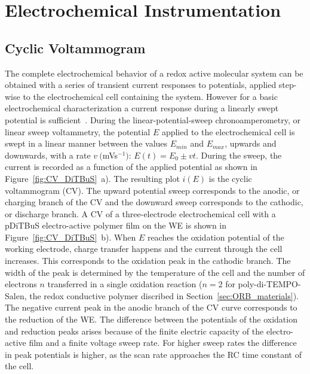 \section{Electrochemical Instrumentation}
\subsection{Cyclic Voltammogram}
The complete electrochemical behavior of a redox active molecular system can be obtained with a series of transient current responses to potentials, applied step-wise to the electrochemical cell containing the system. However for a basic electrochemical characterization a current response during a linearly swept potential is sufficient~\cite{Bard_book}. During the linear-potential-sweep chronoamperometry, or linear sweep voltammetry, the potential $E$ applied to the electrochemical cell is swept in a linear manner between the values $E_{min}$ and $E_{max}$, upwards and downwards, with a rate $v~($mVs$^{-1})$: $E(t) = E_0\pm vt$. During the sweep, the current is recorded as a function of the applied potential as shown in Figure~\ref{fig:CV_DiTBuS}~a). The resulting plot $i(E)$ is the cyclic voltammogram (CV). The upward potential sweep corresponds to the anodic, or charging branch of the CV and the downward sweep corresponds to the cathodic, or discharge branch. A CV of a three-electrode electrochemical cell with a pDiTBuS electro-active polymer film on the WE is shown in Figure~\ref{fig:CV_DiTBuS}~b). When $E$ reaches the oxidation potential of the working electrode, charge transfer happens and the current through the cell increases. This corresponds to the oxidation peak in the cathodic branch. The width of the peak is determined by the temperature of the cell and the number of electrons $n$ transferred in a single oxidation reaction ($n=2$ for poly-di-TEMPO-Salen, the redox conductive polymer discribed in Section~\ref{sec:ORB_materials}). The negative current peak in the anodic branch of the CV curve corresponds to the reduction of the WE. The difference between the potentials of the oxidation and reduction peaks arises because of the finite electric capacity of the electro-active film and a finite voltage sweep rate. For higher sweep rates the difference in peak potentials is higher, as the scan rate approaches the RC time constant of the cell.

